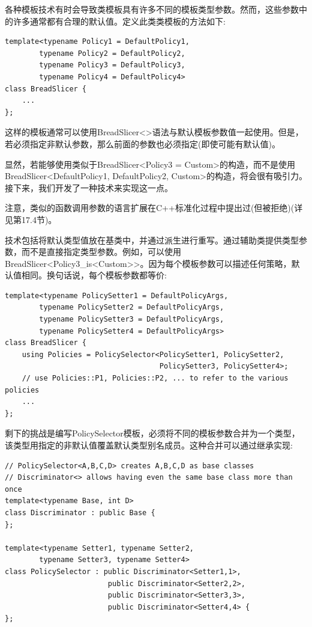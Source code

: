 各种模板技术有时会导致类模板具有许多不同的模板类型参数。然而，这些参数中的许多通常都有合理的默认值。定义此类类模板的方法如下:

\begin{lstlisting}[style=styleCXX]
template<typename Policy1 = DefaultPolicy1,
		typename Policy2 = DefaultPolicy2,
		typename Policy3 = DefaultPolicy3,
		typename Policy4 = DefaultPolicy4>
class BreadSlicer {
	...
};
\end{lstlisting}

这样的模板通常可以使用BreadSlicer<>语法与默认模板参数值一起使用。但是，若必须指定非默认参数，那么前面的参数也必须指定(即使可能有默认值)。

显然，若能够使用类似于BreadSlicer<Policy3 = Custom>的构造，而不是使用BreadSlicer<DefaultPolicy1, DefaultPolicy2, Custom>的构造，将会很有吸引力。接下来，我们开发了一种技术来实现这一点。

\begin{tcolorbox}[colback=webgreen!5!white,colframe=webgreen!75!black]
\hspace*{0.75cm}注意，类似的函数调用参数的语言扩展在C++标准化过程中提出过(但被拒绝)(详见第17.4节)。
\end{tcolorbox}

技术包括将默认类型值放在基类中，并通过派生进行重写。通过辅助类提供类型参数，而不是直接指定类型参数。例如，可以使用BreadSlicer<Policy3\_is<Custom>>。因为每个模板参数可以描述任何策略，默认值相同。换句话说，每个模板参数都等价:

\begin{lstlisting}[style=styleCXX]
template<typename PolicySetter1 = DefaultPolicyArgs,
		typename PolicySetter2 = DefaultPolicyArgs,
		typename PolicySetter3 = DefaultPolicyArgs,
		typename PolicySetter4 = DefaultPolicyArgs>
class BreadSlicer {
	using Policies = PolicySelector<PolicySetter1, PolicySetter2,
									PolicySetter3, PolicySetter4>;
	// use Policies::P1, Policies::P2, ... to refer to the various policies
	...
};
\end{lstlisting}

剩下的挑战是编写PolicySelector模板，必须将不同的模板参数合并为一个类型，该类型用指定的非默认值覆盖默认类型别名成员。这种合并可以通过继承实现:

\begin{lstlisting}[style=styleCXX]
// PolicySelector<A,B,C,D> creates A,B,C,D as base classes
// Discriminator<> allows having even the same base class more than once
template<typename Base, int D>
class Discriminator : public Base {
};

template<typename Setter1, typename Setter2,
		typename Setter3, typename Setter4>
class PolicySelector : public Discriminator<Setter1,1>,
						public Discriminator<Setter2,2>,
						public Discriminator<Setter3,3>,
						public Discriminator<Setter4,4> {
};
\end{lstlisting}

